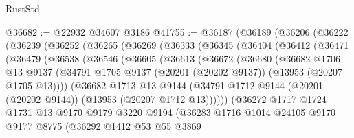 \begin{lexlean}{RustStd}
\begin{coremodule}
@36682 := @22932 @34607 @3186
@41755 := @36187
    (@36189
      (@36206
        (@36222
          (@36239
            (@36252
              (@36265
                (@36269
                  (@36333
                    (@36345
                      (@36404
                        (@36412
                          (@36471
                            (@36479
                              (@36538
                                (@36546
                                  (@36605
                                    (@36613
                                      (@36672
                                        (@36680
                                          (@36682
                                            @1706
                                            @13
                                            @9137
                                            (@34791
                                              @1705
                                              @9137
                                              (@20201 (@20202 @9137))
                                              (@13953 (@20207 @1705 @13))))
                                          (@36682
                                            @1713
                                            @13
                                            @9144
                                            (@34791
                                              @1712
                                              @9144
                                              (@20201 (@20202 @9144))
                                              (@13953 (@20207 @1712 @13))))))
                                      (@36272
                                        @1717
                                        @1724
                                        @1731
                                        @13
                                        @9170
                                        @9179
                                        @3220
                                        @9194
                                        (@36283
                                          @1716
                                          @1014
                                          @24105
                                          @9170
                                          @9177
                                          @8775
                                          (@36292
                                            @1412
                                            @53
                                            @55
                                            @3869

\end{coremodule}
\end{lexlean}
